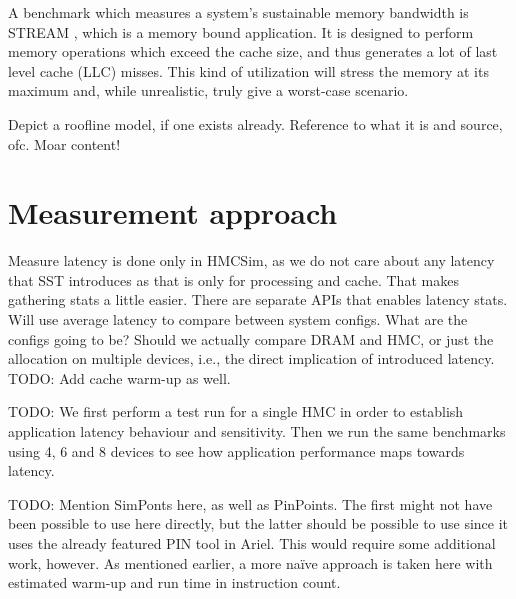 A benchmark which measures a system's sustainable memory bandwidth is STREAM \cite{mccalpin1995memory}, which is a memory bound application. It is designed to perform memory operations which exceed the cache size, and thus generates a lot of last level cache (LLC) misses. This kind of utilization will stress the memory at its maximum and, while unrealistic, truly give a worst-case scenario.

Depict a roofline model, if one exists already. Reference to what it is and source, ofc. Moar content!


\section{Measurement approach}
Measure latency is done only in HMCSim, as we do not care about any latency that SST introduces as that is only for processing and cache. That makes gathering stats a little easier. There are separate APIs that enables latency stats. Will use average latency to compare between system configs. What are the configs going to be? Should we actually compare DRAM and HMC, or just the allocation on multiple devices, i.e., the direct implication of introduced latency. TODO: Add cache warm-up as well.

TODO: We first perform a test run for a single HMC in order to establish application latency behaviour and sensitivity. Then we run the same benchmarks using 4, 6 and 8 devices to see how application performance maps towards latency. 

TODO: Mention SimPonts here, as well as PinPoints. The first might not have been possible to use here directly, but the latter should be possible to use since it uses the already featured PIN tool in Ariel. This would require some additional work, however. As mentioned earlier, a more naïve approach is taken here with estimated warm-up and run time in instruction count. 
